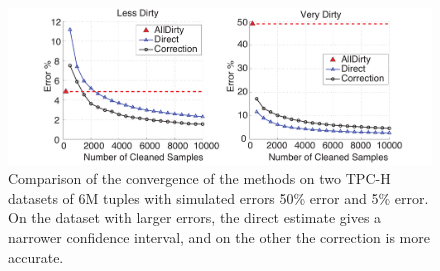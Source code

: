 \begin{figure}
\includegraphics[width=.6\columnwidth]{figs/allerror-samplesize.pdf}
\caption{Comparison of the convergence of the methods on two TPC-H datasets of 6M tuples with simulated errors 50\% error and 5\% error. On the dataset with larger errors, the direct estimate gives a narrower confidence interval, and on the other the correction is more accurate. \label{fig:est2}}
\end{figure}



